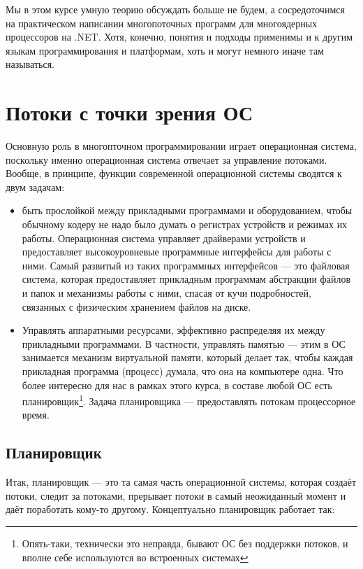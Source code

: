 \documentclass[a5paper]{article}
\begin{document}
Мы в этом курсе умную теорию обсуждать больше не будем, а сосредоточимся на практическом написании многопоточных программ для многоядерных процессоров на .NET. Хотя, конечно, понятия и подходы применимы и к другим языкам программирования и платформам, хоть и могут немного иначе там называться.

\section{Потоки с точки зрения ОС}

Основную роль в многопточном программировании играет операционная система, поскольку именно операционная система отвечает за управление потоками. Вообще, в принципе, функции современной операционной системы сводятся к двум задачам:

\begin{itemize}
    \item быть прослойкой между прикладными программами и оборудованием, чтобы обычному кодеру не надо было думать о регистрах устройств и режимах их работы. Операционная система управляет драйверами устройств и предоставляет высокоуровневые программные интерфейсы для работы с ними. Самый развитый из таких программных интерфейсов --- это файловая система, которая предоставляет прикладным программам абстракции файлов и папок и механизмы работы с ними, спасая от кучи подробностей, связанных с физическим хранением файлов на диске.
    \item Управлять аппаратными ресурсами, эффективно распределяя их между прикладными программами. В частности, управлять памятью --- этим в ОС занимается механизм виртуальной памяти, который делает так, чтобы каждая прикладная программа (процесс) думала, что она на компьютере одна. Что более интересно для нас в рамках этого курса, в составе любой ОС есть планировщик\footnote{Опять-таки, технически это неправда, бывают ОС без поддержки потоков, и вполне себе используются во встроенных системах}. Задача планировщика --- предоставлять потокам процессорное время.
\end{itemize}

\subsection{Планировщик}

Итак, планировщик --- это та самая часть операционной системы, которая создаёт потоки, следит за потоками, прерывает потоки в самый неожиданный момент и даёт поработать кому-то другому. Концептуально планировщик работает так:
\end{document}
